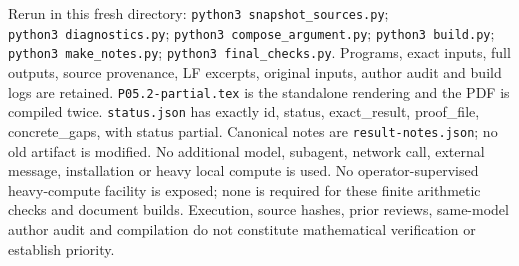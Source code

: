 \documentclass[
  11pt,
]{article}
\begin{document}
Rerun in this fresh directory: \texttt{python3\ snapshot\_sources.py};
\texttt{python3\ diagnostics.py};
\texttt{python3\ compose\_argument.py}; \texttt{python3\ build.py};
\texttt{python3\ make\_notes.py}; \texttt{python3\ final\_checks.py}.
Programs, exact inputs, full outputs, source provenance, LF excerpts,
original inputs, author audit and build logs are retained.
\texttt{P05.2-partial.tex} is the standalone rendering and the PDF is
compiled twice. \texttt{status.json} has exactly id, status,
exact\_result, proof\_file, concrete\_gaps, with status partial.
Canonical notes are \texttt{result-notes.json}; no old artifact is
modified. No additional model, subagent, network call, external message,
installation or heavy local compute is used. No operator-supervised
heavy-compute facility is exposed; none is required for these finite
arithmetic checks and document builds. Execution, source hashes, prior
reviews, same-model author audit and compilation do not constitute
mathematical verification or establish priority.
\end{document}
